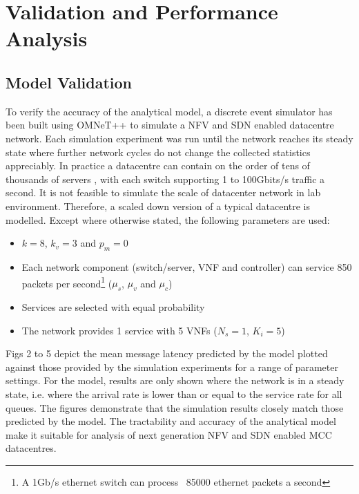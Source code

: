 \begin{figure}
\end{figure}

\section{Validation and Performance Analysis}
\label{sec:validation}

\subsection{Model Validation}

To verify the accuracy of the analytical model, a discrete event simulator has been built using OMNeT++ \cite{VargaH08} to simulate a NFV and SDN enabled datacentre network. Each simulation experiment was run until the network reaches its steady state where further network cycles do not change the collected statistics appreciably. In practice a datacentre can contain on the order of tens of thousands of servers \cite{AWS16}, with each switch supporting 1 to 100Gbits/s traffic a second. It is not feasible to simulate the scale of datacenter network in lab environment. Therefore, a scaled down version of a typical datacentre is modelled. Except where otherwise stated, the following parameters are used:

\begin{itemize}
	\item $k = 8$, $k_{v} = 3$ and $p_{m} = 0$
	\item Each network component (switch/server, VNF and controller) can service 850 packets per second\footnote{A 1Gb/s ethernet switch can process ~85000 ethernet packets a second} ($\mu_{s}$, $\mu_{v}$ and $\mu_{c}$)
	\item Services are selected with equal probability
	\item The network provides 1 service with 5 VNFs ($N_s = 1$, $K_i = 5$)
\end{itemize}

Figs 2 to 5 depict the mean message latency predicted by the model plotted against those provided by the simulation experiments for a range of parameter settings. For the model, results are only shown where the network is in a steady state, i.e. where the arrival rate is lower than or equal to the service rate for all queues. The figures demonstrate that the simulation results closely match those predicted by the model. The tractability and accuracy of the analytical model make it suitable for analysis of next generation NFV and SDN enabled MCC datacentres.

